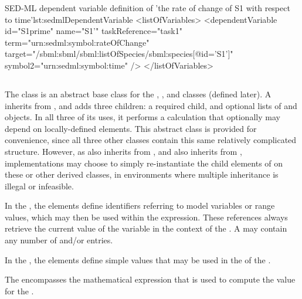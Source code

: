 \begin{blockChanged}
\begin{myXmlLst}{SED-ML dependent variable definition of 'the rate of change of S1 with respect to time'}{lst:sedmlDependentVariable}
<listOfVariables>
	<dependentVariable id="S1prime" name="S1'"  taskReference="task1"
		term="urn:sedml:symbol:rateOfChange"
		target="/sbml:sbml/sbml:listOfSpecies/sbml:species[@id='S1']"
		symbol2="urn:sedml:symbol:time" />
</listOfVariables>
\end{myXmlLst}


\subsection{}
\label{class:calculation}
\label{class:listOfVariables}
\label{class:listOfParameters}

The \Calculation class is an abstract base class for the \ComputeChange, \DataGenerator, and \FunctionalRange classes (defined later).  A \Calculation inherits from \SedBase, and adds three children:  a required \Math child, and optional lists of \Variable and \Parameter objects.  In all three of its uses, it performs a calculation that optionally may depend on locally-defined elements.  This abstract class is provided for convenience, since all three other classes contain this same relatively complicated structure.  However, as \FunctionalRange also inherits from \Range, and \ComputeChange also inherits from \Change, implementations may choose to simply re-instantiate the child elements of \Calculation on these or other derived classes, in environments where multiple inheritance is illegal or infeasible.


In the \ListOfVariables, the \Variable elements define identifiers referring to model variables or range values, which may then be used within the \Math expression. These references always retrieve the current value of the variable in the context of the \Calculation.  A \ListOfVariables may contain any number of \Variable and/or \DependentVariable entries.

In the \ListOfParameters, the \Parameter elements define simple values that may be used in the \Math of the \Calculation.

The \Math encompasses the mathematical expression that is used to compute the value for the \Calculation.


\end{blockChanged}
